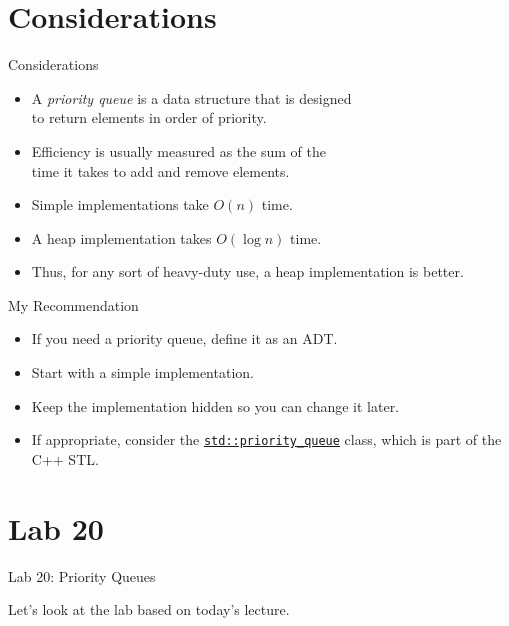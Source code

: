 \documentclass[14pt, aspectratio=1610]{beamer}
\begin{document}
\section{Considerations}
\begin{frame}{Considerations}
\begin{itemize}[<+->]
\item
  A \emph{priority queue} is a data structure that is designed \\to return elements in order of priority.
\item
  Efficiency is usually measured as the sum of the \\time it takes to add and remove elements.
\item
  Simple implementations take \(O(n)\) time.
\item
  A heap implementation takes \(O(\log n)\) time.
\item
  Thus, for any sort of heavy-duty use, a heap implementation is better.
\end{itemize}
\end{frame}

\begin{frame}{My Recommendation}
  \begin{itemize}[<+->]
    \item
      If you need a priority queue, define it as an ADT\@.
    \item
      Start with a simple implementation.
    \item
      Keep the implementation hidden so you can change it later.
    \item
      If appropriate, consider the \href{https://en.cppreference.com/w/cpp/container/priority_queue}{\texttt{std::priority\_queue}} class, which is part of the C++ STL\@.
  \end{itemize}
\end{frame}

\section*{Lab 20}
\begin{frame}{Lab 20: Priority Queues}
\begin{center}\Large
Let's look at the lab based on today's lecture.
\end{center}
\end{frame}
\end{document}
